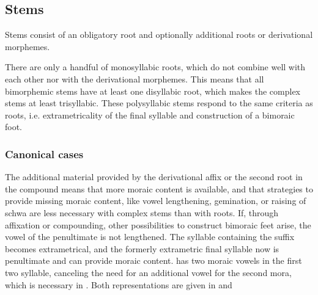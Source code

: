 


\subsection{Stems}\label{sec:phon:analysis:Stems}
Stems consist of an obligatory root and optionally additional roots or derivational morphemes.

There are only a handful of monosyllabic roots, which do not combine well with each other nor with the derivational morphemes. This means that all bimorphemic stems have at least one disyllabic root, which makes the complex stems at least trisyllabic. These polysyllabic stems respond to the same criteria as roots, i.e. extrametricality of the final syllable and construction of a bimoraic foot.

\subsubsection{Canonical cases}\label{sec:phon:Canonicalcasesstems}

The additional material provided by the derivational affix or the second root in the compound means that more moraic content is available, and that strategies to provide missing moraic content, like vowel lengthening, gemination, or raising of schwa are less necessary with complex stems than with roots.
If, through affixation or compounding, other possibilities to construct bimoraic feet arise, the vowel of the penultimate is not lengthened.  The syllable containing the suffix becomes extrametrical, and the formerly extrametric final syllable now is penultimate and can provide moraic content.  has two moraic vowels in the first two syllable, canceling the need for an additional vowel for the second mora, which is necessary in . Both representations are given in  and 

